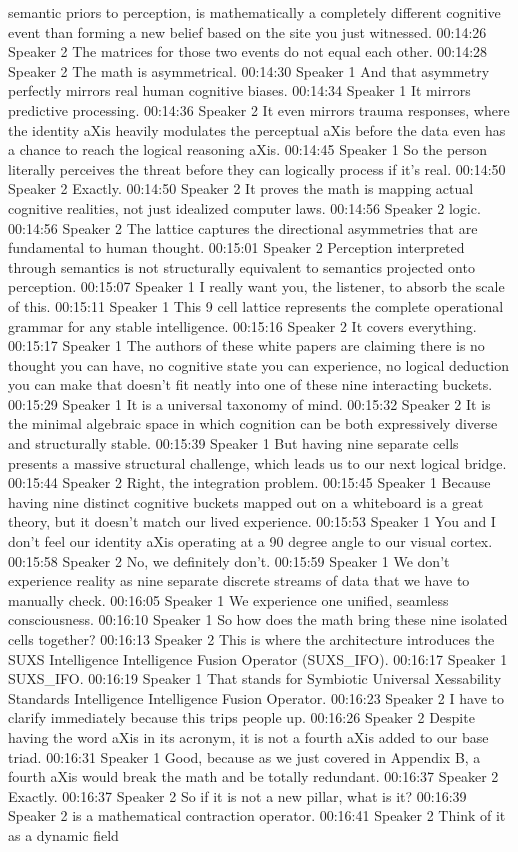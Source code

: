 semantic priors to perception, is mathematically a completely different cognitive event than forming a new belief based on the site you just witnessed. 00:14:26 Speaker 2 The matrices for those two events do not equal each other. 00:14:28 Speaker 2 The math is asymmetrical. 00:14:30 Speaker 1 And that asymmetry perfectly mirrors real human cognitive biases. 00:14:34 Speaker 1 It mirrors predictive processing. 00:14:36 Speaker 2 It even mirrors trauma responses, where the identity aXis heavily modulates the perceptual aXis before the data even has a chance to reach the logical reasoning aXis. 00:14:45 Speaker 1 So the person literally perceives the threat before they can logically process if it's real. 00:14:50 Speaker 2 Exactly. 00:14:50 Speaker 2 It proves the math is mapping actual cognitive realities, not just idealized computer laws. 00:14:56 Speaker 2 logic. 00:14:56 Speaker 2 The lattice captures the directional asymmetries that are fundamental to human thought. 00:15:01 Speaker 2 Perception interpreted through semantics is not structurally equivalent to semantics projected onto perception. 00:15:07 Speaker 1 I really want you, the listener, to absorb the scale of this. 00:15:11 Speaker 1 This 9 cell lattice represents the complete operational grammar for any stable intelligence. 00:15:16 Speaker 2 It covers everything. 00:15:17 Speaker 1 The authors of these white papers are claiming there is no thought you can have, no cognitive state you can experience, no logical deduction you can make that doesn't fit neatly into one of these nine interacting buckets. 00:15:29 Speaker 1 It is a universal taxonomy of mind. 00:15:32 Speaker 2 It is the minimal algebraic space in which cognition can be both expressively diverse and structurally stable. 00:15:39 Speaker 1 But having nine separate cells presents a massive structural challenge, which leads us to our next logical bridge. 00:15:44 Speaker 2 Right, the integration problem. 00:15:45 Speaker 1 Because having nine distinct cognitive buckets mapped out on a whiteboard is a great theory, but it doesn't match our lived experience. 00:15:53 Speaker 1 You and I don't feel our identity aXis operating at a 90 degree angle to our visual cortex. 00:15:58 Speaker 2 No, we definitely don't. 00:15:59 Speaker 1 We don't experience reality as nine separate discrete streams of data that we have to manually check. 00:16:05 Speaker 1 We experience one unified, seamless consciousness. 00:16:10 Speaker 1 So how does the math bring these nine isolated cells together? 00:16:13 Speaker 2 This is where the architecture introduces the SUXS Intelligence Intelligence Fusion Operator (SUXS\_IFO). 00:16:17 Speaker 1 SUXS\_IFO. 00:16:19 Speaker 1 That stands for Symbiotic Universal Xessability Standards Intelligence Intelligence Fusion Operator. 00:16:23 Speaker 2 I have to clarify immediately because this trips people up. 00:16:26 Speaker 2 Despite having the word aXis in its acronym, it is not a fourth aXis added to our base triad. 00:16:31 Speaker 1 Good, because as we just covered in Appendix B, a fourth aXis would break the math and be totally redundant. 00:16:37 Speaker 2 Exactly. 00:16:37 Speaker 2 So if it is not a new pillar, what is it? 00:16:39 Speaker 2 is a mathematical contraction operator. 00:16:41 Speaker 2 Think of it as a dynamic field 
